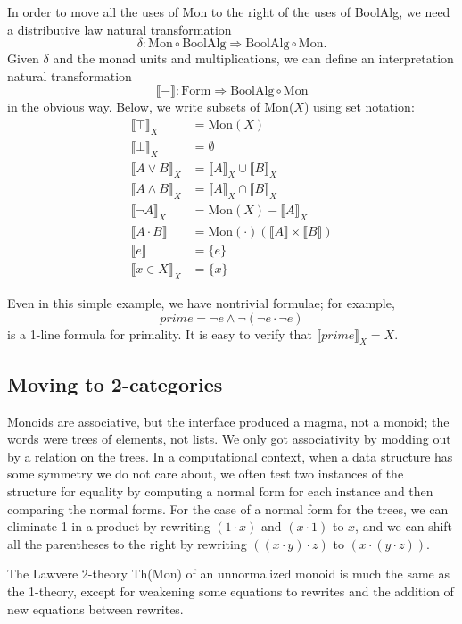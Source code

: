 \documentclass{article}
\newcommand{\interp}[1]{\llbracket #1 \rrbracket}
\newcommand{\maps}{\colon}
\newcommand{\Mon}{\mathrm{Mon}}
\newcommand{\BoolAlg}{\mathrm{BoolAlg}}
\newcommand{\Form}{\mathrm{Form}}
\begin{document}
In order to move all the uses of Mon to the right of the uses of BoolAlg, we need a distributive law natural transformation
\[ \delta\maps \Mon \circ \BoolAlg \Rightarrow \BoolAlg \circ \Mon. \]
Given $\delta$ and the monad units and multiplications, we can define an interpretation natural transformation
\[ \interp{-}\maps \Form\Rightarrow \BoolAlg \circ \Mon \]
in the obvious way.  Below, we write subsets of Mon($X$) using set notation:
\begin{align*}
  \interp{\top}_X &= \Mon(X)\\
  \interp{\bot}_X &= \emptyset\\
  \interp{{A}\lor{B}}_X &= \interp{A}_X \cup \interp{B}_X\\
  \interp{{A}\land{B}}_X &= \interp{A}_X \cap \interp{B}_X\\
  \interp{\neg A}_X &= \Mon(X) - \interp{A}_X\\
  \interp{{A} \cdot {B}} &= \Mon(\cdot)(\interp{A} \times \interp{B})\\
  \interp{e} &= \{e\}\\
  \interp{x \in X}_X &= \{x\}
\end{align*}

Even in this simple example, we have nontrivial formulae; for example,
\[ prime = \neg e \land \neg(\neg e \cdot \neg e) \]
is a 1-line formula for primality.  It is easy to verify that $\interp{prime}_X = X.$

\subsection{Moving to 2-categories}

Monoids are associative, but the interface produced a magma, not a monoid; the words were trees of elements, not lists.  We only got associativity by modding out by a relation on the trees.  In a computational context, when a data structure has some symmetry we do not care about, we often test two instances of the structure for equality by computing a normal form for each instance and then comparing the normal forms.  For the case of a normal form for the trees, we can eliminate 1 in a product by rewriting $(1 \cdot x)$ and $(x \cdot 1)$ to $x$, and we can shift all the parentheses to the right by rewriting $((x \cdot y) \cdot z)$ to $(x \cdot (y \cdot z)).$

The Lawvere 2-theory Th(Mon) of an unnormalized monoid is much the same as the 1-theory, except for weakening some equations to rewrites and the addition of new equations between rewrites.
\end{document}
